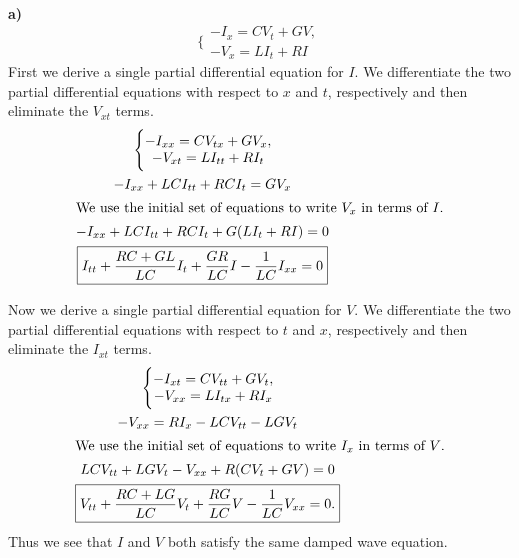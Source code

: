 {%
\begin{Solution}
  $\phantom{a}$

  \textbf{a)}
  \[
  \Bigg\{
  \begin{matrix}
    -I_x = C V_t + G V, \\
    -V_x = L I_t + R I
  \end{matrix}
  \]
  First we derive a single partial differential equation for $I$.
  We differentiate the two partial differential equations with respect to $x$
  and $t$, respectively and then eliminate the $V_{x t}$ terms. 
  \begin{gather*}
    \Bigg\{
    \begin{matrix}
      -I_{x x} = C V_{t x} + G V_x, \\
      -V_{x t} = L I_{t t} + R I_t
    \end{matrix} \\
    -I_{x x} + L C I_{t t} + R C I_t = G V_x \\
    \intertext{We use the initial set of equations to write $V_x$ in terms of $I$.}
    -I_{x x} + L C I_{t t} + R C I_t + G ( L I_t + R I ) = 0 \\
    \boxed{
      I_{t t} + \frac{R C + G L}{L C} I_t + \frac{G R}{L C} I - \frac{1}{L C} I_{x x}
      = 0
      }
  \end{gather*}

  Now we derive a single partial differential equation for $V$.
  We differentiate the two partial differential equations with respect to $t$
  and $x$, respectively and then eliminate the $I_{x t}$ terms. 
  \begin{gather*}
    \Bigg\{
    \begin{matrix}
      -I_{x t} = C V_{t t} + G V_t, \\
      -V_{x x} = L I_{t x} + R I_x
    \end{matrix} \\
    -V_{x x} = R I_x - L C V_{t t} - L G V_t \\
    \intertext{We use the initial set of equations to write $I_x$ in terms of $V$.}
    L C V_{t t} + L G V_t - V_{x x} + R (C V_t + G V) = 0 \\
    \boxed{
      V_{t t} + \frac{R C + L G}{L C} V_t + \frac{R G}{L C} V  
      - \frac{1}{L C} V_{x x} = 0.
      }
  \end{gather*}
  Thus we see that $I$ and $V$ both satisfy the same damped wave equation.


\end{Solution}}
